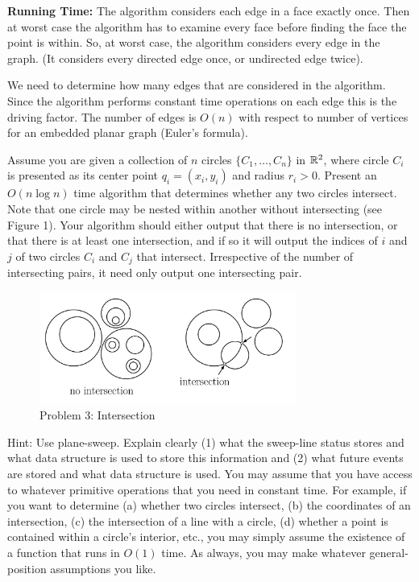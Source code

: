\documentclass[11pt]{article}
\begin{document}
\textbf{Running Time: } 
The algorithm considers each edge in a face exactly once. Then at worst case the algorithm has to examine
every face before finding the face the point is within. So, at worst case, the algorithm considers every edge in the graph.
(It considers every directed edge once, or undirected edge twice).

We need to determine how many edges that are considered in the algorithm.
Since the algorithm performs constant time operations on each edge this is the driving factor.
The number of edges is $O(n)$ with respect to number of vertices for an embedded planar graph (Euler's formula).


Assume you are given a collection of $n$ circles $\{C_1 , \ldots , C_n \}$ in
$\mathbb{R}^2$, where circle $C_i$ is presented as its center point $q_i = (x_i, y_i)$
and radius $r_i > 0$. Present an $O(n \log n)$ time algorithm that determines
whether any two circles intersect. Note that one circle may be nested within
another without intersecting (see Figure 1). Your algorithm should either output
that there is no intersection, or that there is at least one intersection, and
if so it will output the indices of $i$ and $j$ of two circles $C_i$ and $C_j$
that intersect. Irrespective of the number of intersecting pairs, it need only
output one intersecting pair.

\begin{figure}[h]
    \centering
    \includegraphics[width=0.75\textwidth]{intersection}
    \caption{Problem 3: Intersection}
\end{figure}

Hint: Use plane-sweep. Explain clearly (1) what the sweep-line status stores and
what data structure is used to store this information and (2) what future events
are stored and what data structure is used. You may assume that you have access
to whatever primitive operations that you need in constant time. For example, if
you want to determine (a) whether two circles intersect, (b) the coordinates of
an intersection, (c) the intersection of a line with a circle, (d) whether a
point is contained within a circle's interior, etc., you may simply assume the
existence of a function that runs in $O(1)$ time. As always, you may make
whatever general-position assumptions you like.
\end{document}
